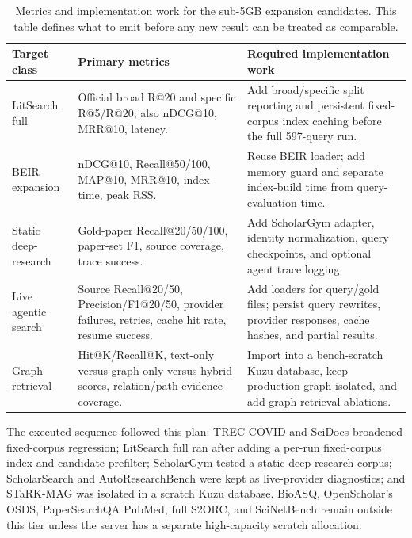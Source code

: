 \documentclass[11pt]{article}
\begin{document}
\begin{table}[t]
\centering
\caption{Metrics and implementation work for the sub-5GB expansion candidates. This table defines what to emit before any new result can be treated as comparable.}
\label{tab:sub5g-metric-plan}
\scriptsize
\begin{tabularx}{\linewidth}{@{}l Y Y@{}}
\toprule
Target class & Primary metrics & Required implementation work \\
\midrule
LitSearch full & Official broad R@20 and specific R@5/R@20; also nDCG@10, MRR@10, latency. & Add broad/specific split reporting and persistent fixed-corpus index caching before the full 597-query run. \\
BEIR expansion & nDCG@10, Recall@50/100, MAP@10, MRR@10, index time, peak RSS. & Reuse BEIR loader; add memory guard and separate index-build time from query-evaluation time. \\
Static deep-research & Gold-paper Recall@20/50/100, paper-set F1, source coverage, trace success. & Add ScholarGym adapter, identity normalization, query checkpoints, and optional agent trace logging. \\
Live agentic search & Source Recall@20/50, Precision/F1@20/50, provider failures, retries, cache hit rate, resume success. & Add loaders for query/gold files; persist query rewrites, provider responses, cache hashes, and partial results. \\
Graph retrieval & Hit@K/Recall@K, text-only versus graph-only versus hybrid scores, relation/path evidence coverage. & Import into a bench-scratch Kuzu database, keep production graph isolated, and add graph-retrieval ablations. \\
\bottomrule
\end{tabularx}
\end{table}

The executed sequence followed this plan: TREC-COVID and SciDocs broadened fixed-corpus regression; LitSearch full ran after adding a per-run fixed-corpus index and candidate prefilter; ScholarGym tested a static deep-research corpus; ScholarSearch and AutoResearchBench were kept as live-provider diagnostics; and STaRK-MAG was isolated in a scratch Kuzu database. BioASQ, OpenScholar's OSDS, PaperSearchQA PubMed, full S2ORC, and SciNetBench remain outside this tier unless the server has a separate high-capacity scratch allocation.
\end{document}

